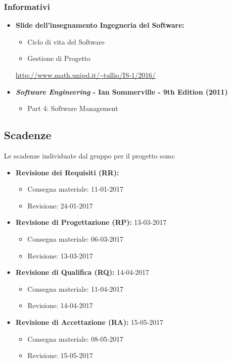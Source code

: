 \subsubsection{Informativi}
\begin{itemize}
\item \textbf{Slide dell'insegnamento Ingegneria del Software:}
\begin{itemize}
\item Ciclo di vita del Software
\item Gestione di Progetto
\end{itemize}
\url{http://www.math.unipd.it/~tullio/IS-1/2016/}
\item \textbf{\textit{Software Engineering} - Ian Sommerville - 9th Edition (2011)}
\begin{itemize}
\item Part 4: Software Management
\end{itemize} 
\end{itemize}

\subsection{Scadenze}
Le scadenze individuate dal gruppo \GroupName{} per il progetto \ProjectName{} sono:
\begin{itemize}
	\item \textbf{Revisione dei Requisiti (RR):}
	\begin{itemize}
		\item Consegna materiale: 11-01-2017
		\item Revisione: 24-01-2017
	\end{itemize}
	\item \textbf{Revisione di Progettazione (RP):} 13-03-2017
	\begin{itemize}
		\item Consegna materiale: 06-03-2017
		\item Revisione: 13-03-2017
	\end{itemize}
	\item \textbf{Revisione di Qualifica (RQ):} 14-04-2017
	\begin{itemize}
		\item Consegna materiale: 11-04-2017
		\item Revisione: 14-04-2017
	\end{itemize}
	\item \textbf{Revisione di Accettazione (RA):} 15-05-2017
	\begin{itemize}
		\item Consegna materiale: 08-05-2017
		\item Revisione: 15-05-2017
	\end{itemize}
\end{itemize}

